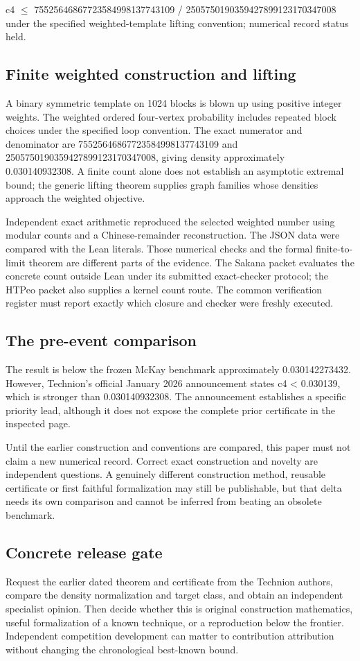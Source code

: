 \documentclass[11pt,a4paper]{article}
\begin{document}
c4 \ensuremath{\leq} 75525646867723584998137743109 / 2505750190359427899123170347008 under the specified weighted-template lifting convention; numerical record status held.

\subsection{Finite weighted construction and lifting}
A binary symmetric template on 1024 blocks is blown up using positive integer weights. The weighted ordered four-vertex probability includes repeated block choices under the specified loop convention. The exact numerator and denominator are 75525646867723584998137743109 and 2505750190359427899123170347008, giving density approximately 0.030140932308. A finite count alone does not establish an asymptotic extremal bound; the generic lifting theorem supplies graph families whose densities approach the weighted objective.

Independent exact arithmetic reproduced the selected weighted number using modular counts and a Chinese-remainder reconstruction. The JSON data were compared with the Lean literals. Those numerical checks and the formal finite-to-limit theorem are different parts of the evidence. The Sakana packet evaluates the concrete count outside Lean under its submitted exact-checker protocol; the HTPeo packet also supplies a kernel count route. The common verification register must report exactly which closure and checker were freshly executed.

\subsection{The pre-event comparison}
The result is below the frozen McKay benchmark approximately 0.030142273432. However, Technion's official January 2026 announcement states c4 < 0.030139, which is stronger than 0.030140932308. The announcement establishes a specific priority lead, although it does not expose the complete prior certificate in the inspected page.

Until the earlier construction and conventions are compared, this paper must not claim a new numerical record. Correct exact construction and novelty are independent questions. A genuinely different construction method, reusable certificate or first faithful formalization may still be publishable, but that delta needs its own comparison and cannot be inferred from beating an obsolete benchmark.

\subsection{Concrete release gate}
Request the earlier dated theorem and certificate from the Technion authors, compare the density normalization and target class, and obtain an independent specialist opinion. Then decide whether this is original construction mathematics, useful formalization of a known technique, or a reproduction below the frontier. Independent competition development can matter to contribution attribution without changing the chronological best-known bound.
\end{document}
